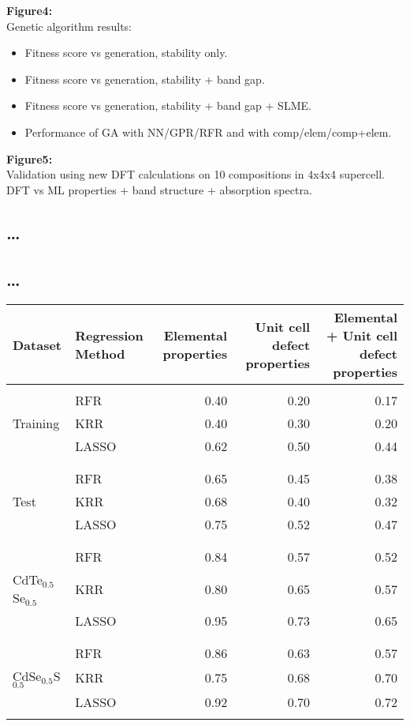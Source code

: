 \documentclass[aip, jmp, amsmath, amssymb, reprint]{revtex4-2}
\begin{document}
\textbf{Figure4:}\\
Genetic algorithm results:

\begin{itemize}
\item Fitness score vs generation, stability only.

\item Fitness score vs generation, stability + band gap.

\item Fitness score vs generation, stability + band gap + SLME.

\item Performance of GA with NN/GPR/RFR and with comp/elem/comp+elem.\\
\end{itemize}

\textbf{Figure5:}\\
Validation using new DFT calculations on 10 compositions in 4x4x4
supercell. DFT vs ML properties + band structure + absorption spectra.\\

\subsection*{\ldots{}}
\label{sec:org4170259}
\subsection*{\ldots{}}
\label{sec:org5db9426}
\begin{center}
\begin{tabular}{llrrr}
\textbf{Dataset} & \textbf{Regression Method} & \textbf{Elemental properties} & \textbf{Unit cell defect properties} & \textbf{Elemental + Unit cell defect properties}\\
\hline
 &  &  &  & \\
 & RFR & 0.40 & 0.20 & 0.17\\
Training & KRR & 0.40 & 0.30 & 0.20\\
 & LASSO & 0.62 & 0.50 & 0.44\\
 &  &  &  & \\
 &  &  &  & \\
 & RFR & 0.65 & 0.45 & 0.38\\
Test & KRR & 0.68 & 0.40 & 0.32\\
 & LASSO & 0.75 & 0.52 & 0.47\\
 &  &  &  & \\
 &  &  &  & \\
 & RFR & 0.84 & 0.57 & 0.52\\
CdTe\(_{0.5}\)Se\(_{0.5}\) & KRR & 0.80 & 0.65 & 0.57\\
 & LASSO & 0.95 & 0.73 & 0.65\\
 &  &  &  & \\
 &  &  &  & \\
 & RFR & 0.86 & 0.63 & 0.57\\
CdSe\(_{0.5}\)S\(_{0.5}\) & KRR & 0.75 & 0.68 & 0.70\\
 & LASSO & 0.92 & 0.70 & 0.72\\
 &  &  &  & \\
\end{tabular}
\end{center}
\end{document}
